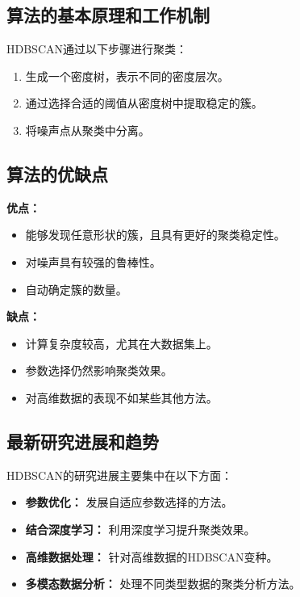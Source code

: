\subsection*{算法的基本原理和工作机制}
HDBSCAN通过以下步骤进行聚类：
\begin{enumerate}
    \item 生成一个密度树，表示不同的密度层次。
    \item 通过选择合适的阈值从密度树中提取稳定的簇。
    \item 将噪声点从聚类中分离。
\end{enumerate}

\subsection*{算法的优缺点}
\textbf{优点：}
\begin{itemize}
    \item 能够发现任意形状的簇，且具有更好的聚类稳定性。
    \item 对噪声具有较强的鲁棒性。
    \item 自动确定簇的数量。
\end{itemize}

\textbf{缺点：}
\begin{itemize}
    \item 计算复杂度较高，尤其在大数据集上。
    \item 参数选择仍然影响聚类效果。
    \item 对高维数据的表现不如某些其他方法。
\end{itemize}

\subsection*{最新研究进展和趋势}
HDBSCAN的研究进展主要集中在以下方面：
\begin{itemize}
    \item \textbf{参数优化：} 发展自适应参数选择的方法。
    \item \textbf{结合深度学习：} 利用深度学习提升聚类效果。
    \item \textbf{高维数据处理：} 针对高维数据的HDBSCAN变种。
    \item \textbf{多模态数据分析：} 处理不同类型数据的聚类分析方法。
\end{itemize}
